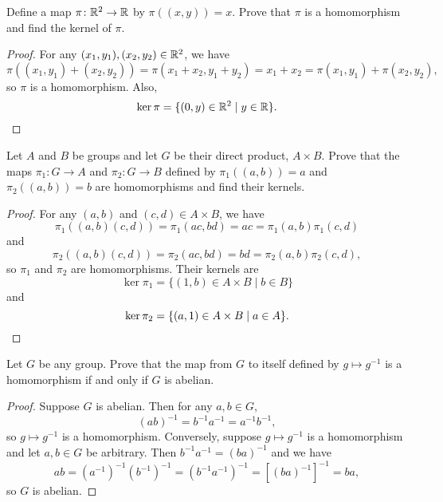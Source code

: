  Define a map $\pi\colon\mathbb{R}^2\to\mathbb{R}$ by
$\pi((x,y))=x$. Prove that $\pi$ is a homomorphism and find the kernel
of $\pi$.
\begin{proof}
  For any $(x_1,y_1),(x_2,y_2)\in\mathbb{R}^2$, we have
  \begin{equation*}
    \pi((x_1,y_1) + (x_2,y_2)) = \pi(x_1 + x_2,y_1 + y_2) = x_1 + x_2
    = \pi(x_1,y_1) + \pi(x_2,y_2),
  \end{equation*}
  so $\pi$ is a homomorphism. Also,
  \begin{equation*}
    \ker\pi = \{ (0, y)\in\mathbb{R}^2 \mid y\in\mathbb{R} \}. \qedhere
  \end{equation*}
\end{proof}

 Let $A$ and $B$ be groups and let $G$ be their direct
product, $A\times B$. Prove that the maps $\pi_1\colon G\to A$ and
$\pi_2\colon G\to B$ defined by $\pi_1((a,b)) = a$ and
$\pi_2((a,b)) = b$ are homomorphisms and find their kernels.
\begin{proof}
  For any $(a,b)$ and $(c,d)\in A\times B$, we have
  \begin{equation*}
    \pi_1((a,b)(c,d)) = \pi_1(ac,bd) = ac = \pi_1(a,b)\pi_1(c,d)
  \end{equation*}
  and
  \begin{equation*}
    \pi_2((a,b)(c,d)) = \pi_2(ac,bd) = bd = \pi_2(a,b)\pi_2(c,d),
  \end{equation*}
  so $\pi_1$ and $\pi_2$ are homomorphisms. Their kernels are
  \begin{equation*}
    \ker\pi_1 = \{ (1, b)\in A\times B \mid b\in B \}
  \end{equation*}
  and
  \begin{equation*}
    \ker\pi_2 = \{ (a, 1)\in A\times B \mid a\in A \}. \qedhere
  \end{equation*}
\end{proof}

 Let $G$ be any group. Prove that the map from $G$ to
itself defined by $g\mapsto g^{-1}$ is a homomorphism if and only if
$G$ is abelian.
\begin{proof}
  Suppose $G$ is abelian. Then for any $a,b\in G$,
  \begin{equation*}
    (ab)^{-1} = b^{-1}a^{-1} = a^{-1}b^{-1},
  \end{equation*}
  so $g\mapsto g^{-1}$ is a homomorphism. Conversely, suppose
  $g\mapsto g^{-1}$ is a homomorphism and let $a,b\in G$ be
  arbitrary. Then $b^{-1}a^{-1} = (ba)^{-1}$ and we have
  \begin{equation*}
    ab = (a^{-1})^{-1}(b^{-1})^{-1} = (b^{-1}a^{-1})^{-1}
    = [(ba)^{-1}]^{-1} = ba,
  \end{equation*}
  so $G$ is abelian.
\end{proof}


